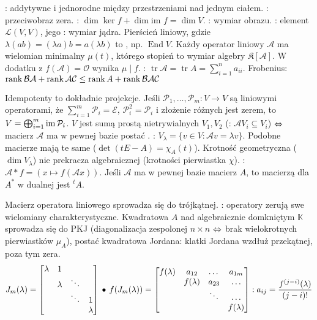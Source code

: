 :  addytywne i jednorodne między przestrzeniami nad jednym ciałem.
: przeciwobraz zera.
: 
$\dim \ker f + \dim \text{im } f = \dim V$.
: wymiar obrazu.
:  element $\mathcal L(V,V)$, jego : wymiar jądra.
Pierścień liniowy, gdzie $\lambda (ab) = (\lambda a) b = a (\lambda b)$ to , np. $\operatorname{End} V$.
Każdy operator liniowy $\mathcal A$ ma wielomian minimalny $\mu(t)$, którego stopień to wymiar algebry $\mathfrak K[\mathcal A]$. %
W dodatku z $f(\mathcal A) = \mathcal O$ wynika $\mu \mid f$.
: $\operatorname{tr} \mathcal A = \operatorname{tr} A = \sum_{i=1}^n a_{ii}$.
Frobenius: $\operatorname{rank} \mathcal B \mathcal A + \operatorname{rank} \mathcal A \mathcal C \le \operatorname{rank} A + \operatorname{rank} \mathcal B \mathcal A \mathcal C$

Idempotenty  to dokładnie projekcje.
Jeśli $\mathcal P_1, \dots, \mathcal P_m \colon V \to V$ są liniowymi operatorami, że $\sum_{i=1}^m \mathcal P_i = \mathcal E$, $\mathcal P_i^2 = \mathcal P_i$ i 
złożenie różnych jest zerem, to $V = \bigoplus_{i=1}^m \operatorname{im} \mathcal P_i$.
$V$ jest sumą prostą nietrywialnych $V_1, V_2$ (: $\mathcal A V_i \subseteq V_i$) $\Leftrightarrow$ macierz $\mathcal A$ ma w pewnej bazie postać .
: $V_\lambda = \{v \in V: \mathcal A v = \lambda v\}$. 
Podobne macierze mają te same  ($\det(tE-A) = \chi_A(t)$).
Krotność geometryczna ($\dim V_\lambda$) nie prekracza algebraicznej (krotności pierwiastka $\chi$). 
: $\mathcal A* f = (x \mapsto f(\mathcal Ax))$.
Jeśli $\mathcal A$ ma w pewnej bazie macierz $A$, to macierzą dla $A^*$ w dualnej jest ${}^tA$.

Macierz  operatora liniowego sprowadza się do trójkątnej.
: operatory zerują swe wielomiany charakterystyczne.
Kwadratowa $A$ nad algebraicznie domkniętym $\mathbb K$ sprowadza się do PKJ (diagonalizacja zespolonej $n \times n$ $\Leftrightarrow$ brak wielokrotnych pierwiastków $\mu_A$), postać kwadratowa Jordana: klatki Jordana wzdłuż przekątnej, poza tym zera.
\[
	J_m(\lambda) =\begin{bmatrix} \lambda & 1 & \; & \; \\ \; & \lambda & \ddots & \; \\ \; & \; & \ddots & 1 \\ \; & \; & \; & \lambda \end{bmatrix} \, \bullet \,
	f(J_m(\lambda)) = \begin{bmatrix} f(\lambda) & a_{12} & \dots & a_{1m} \\ \; & f(\lambda) & a_{23} & \dots \\ \; & \; & \ddots & \dots \\ \; & \; & \; & f(\lambda) \end{bmatrix} : a_{ij} = \frac{f^{(j-i)}(\lambda)}{(j-i)!} 
\]